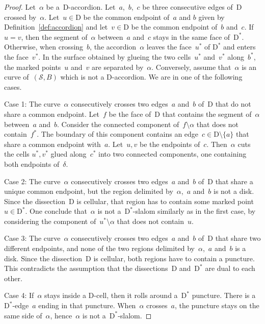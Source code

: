 \documentclass{amsart}
\theoremstyle{definition}
\newcommand{\surface}{\mathcal{S}} %
\newcommand{\dual}{^*} %
\newcommand{\dissection}{\mathrm{D}} %
\begin{document}
\begin{proof}
Let~$\alpha$ be a~$\dissection$-accordion.
Let~$a$,~$b$,~$c$ be three consecutive edges of~$\dissection$ crossed by~$\alpha$.
Let~$u \in \dissection$ be the common endpoint of~$a$ and $b$ given by Definition~\ref{def:accordion} and let~$v \in \dissection$ be the common endpoint of~$b$ and~$c$.
If $u = v$, then the segment of~$\alpha$ between~$a$ and~$c$ stays in the same face of~$\dissection\dual$.
Otherwise, when crossing~$b$, the accordion~$\alpha$ leaves the face~$u\dual$ of $\dissection\dual$ and enters the face~$v\dual$.
In the surface obtained by glueing the two cells~$u\dual$ and~$v\dual$ along~$b\dual$, the marked points~$u$ and~$v$ are separated by~$\alpha$.
Conversely, assume that~$\alpha$ is an curve of~$(\surface, B)$ which is not a $\dissection$-accordion.
We are in one of the following cases.

Case 1: The curve~$\alpha$ consecutively crosses two edges~$a$ and~$b$ of~$\dissection$ that do not share a common endpoint.
Let~$f$ be the face of~$\dissection$ that contains the segment of~$\alpha$ between~$a$ and~$b$.
Consider the connected component of~$f\setminus\alpha$ that does not contain~$f\dual$.
The boundary of this component contains an edge~$c \in \dissection \setminus \{a\}$ that share a common endpoint with~$a$.
Let~$u,v$ be the endpoints of~$c$.
Then~$\alpha$ cuts the cells $u\dual,v\dual$ glued along~$c\dual$ into two connected components, one containing both endpoints of~$\delta$.

Case 2: The curve~$\alpha$ consecutively crosses two edges~$a$ and~$b$ of~$\dissection$ that share a unique common endpoint, but the region delimited by~$\alpha$,~$a$ and~$b$ is not a disk.
Since the dissection~$\dissection$ is cellular, that region has to contain some marked point~$u \in \dissection\dual$.
One conclude that~$\alpha$ is not a~$\dissection\dual$-slalom similarly as in the first case, by considering the component of~$u\dual \setminus \alpha$ that does not contain~$u$.

Case 3: The curve~$\alpha$ consecutively crosses two edges~$a$ and~$b$ of~$\dissection$ that share two different endpoints, and none of the two regions delimited by~$\alpha$,~$a$ and~$b$ is a disk.
Since the dissection~$\dissection$ is cellular, both regions have to contain a puncture.
This contradicts the assumption that the dissections~$\dissection$ and~$\dissection\dual$ are dual to each other.

Case 4: If~$\alpha$ stays inside a $\dissection$-cell, then it rolls around a~$\dissection\dual$ puncture.
There is a~$\dissection\dual$-edge~$a$ ending in that puncture. When~$\alpha$ crosses~$a$, the puncture stays on the same side of~$\alpha$, hence~$\alpha$ is not a~$\dissection\dual$-slalom.
\end{proof}
\end{document}
